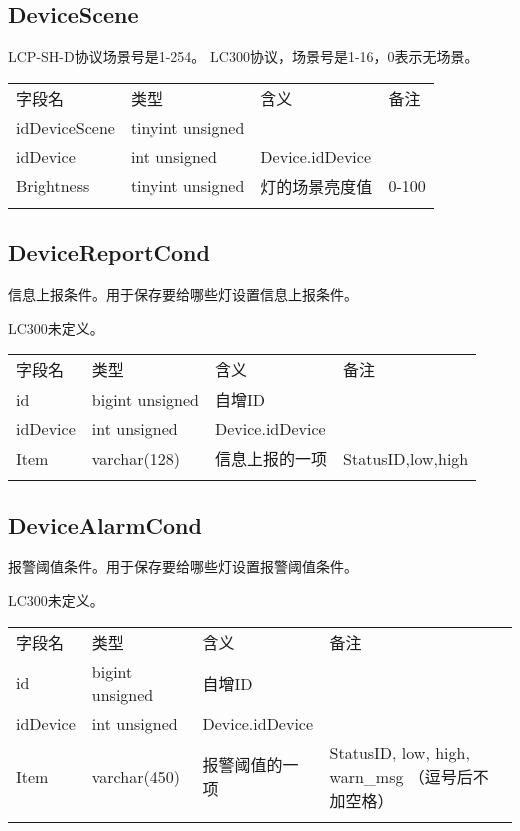 \subsection{DeviceScene}\label{devicescene}

LCP-SH-D协议场景号是1-254。 LC300协议，场景号是1-16，0表示无场景。

\begin{longtabu}[c]{@{}lXXX@{}}
\toprule\addlinespace
字段名 & 类型 & 含义 & 备注
\\\addlinespace
\midrule\endhead
idDeviceScene & tinyint unsigned & &
\\\addlinespace
idDevice & int unsigned & Device.idDevice &
\\\addlinespace
Brightness & tinyint unsigned & 灯的场景亮度值 & 0-100
\\\addlinespace
\bottomrule
\end{longtabu}

\subsection{DeviceReportCond}\label{devicereportcond}

信息上报条件。用于保存要给哪些灯设置信息上报条件。

LC300未定义。

\begin{longtabu}[c]{@{}lXXX@{}}
\toprule\addlinespace
字段名 & 类型 & 含义 & 备注
\\\addlinespace
\midrule\endhead
id & bigint unsigned & 自增ID &
\\\addlinespace
idDevice & int unsigned & Device.idDevice &
\\\addlinespace
Item & varchar(128) & 信息上报的一项 & StatusID,low,high
\\\addlinespace
\bottomrule
\end{longtabu}

\subsection{DeviceAlarmCond}\label{devicealarmcond}

报警阈值条件。用于保存要给哪些灯设置报警阈值条件。

LC300未定义。

\begin{longtabu}[c]{@{}lXXX@{}}
\toprule\addlinespace
字段名 & 类型 & 含义 & 备注
\\\addlinespace
\midrule\endhead
id & bigint unsigned & 自增ID &
\\\addlinespace
idDevice & int unsigned & Device.idDevice &
\\\addlinespace
Item & varchar(450) & 报警阈值的一项 & StatusID, low, high, warn\_msg
（逗号后不加空格）
\\\addlinespace
\bottomrule
\end{longtabu}

